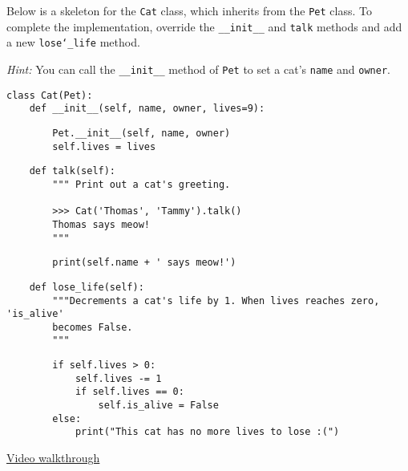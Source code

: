 \question Below is a skeleton for the \texttt{Cat} class, which inherits from
the \texttt{Pet} class. To complete the implementation, override the
\texttt{\_\_init\_\_} and \texttt{talk} methods and add a new
\texttt{lose\char`_life} method.

\textit{Hint:} You can call the \texttt{\_\_init\_\_} method of \texttt{Pet} to
set a cat's \texttt{name} and \texttt{owner}.

\begin{lstlisting}
class Cat(Pet):
    def __init__(self, name, owner, lives=9):
        \end{lstlisting}

        \begin{solution}[.3in]
        \begin{lstlisting}
        Pet.__init__(self, name, owner)
        self.lives = lives
        \end{lstlisting}
        \end{solution}

        \begin{lstlisting}
    def talk(self):
        """ Print out a cat's greeting.

        >>> Cat('Thomas', 'Tammy').talk()
        Thomas says meow!
        """
        \end{lstlisting}

        \begin{solution}[.3in]
        \begin{lstlisting}
        print(self.name + ' says meow!')
        \end{lstlisting}
        \end{solution}

        \begin{lstlisting}
    def lose_life(self):
        """Decrements a cat's life by 1. When lives reaches zero, 'is_alive'
        becomes False.
        """
        \end{lstlisting}

        \begin{solution}[.3in]
        \begin{lstlisting}
        if self.lives > 0:
            self.lives -= 1
            if self.lives == 0:
                self.is_alive = False
        else:
            print("This cat has no more lives to lose :(")
        \end{lstlisting}
        \end{solution}
\begin{solution}
\href{https://www.youtube.com/watch?v=BatqjYa7WZ8&list=PLx38hZJ5RLZfel-Gi9pjaUbfQDCZIsWMU&vq=hd1080&t=34m50s}{Video walkthrough}
\end{solution}

